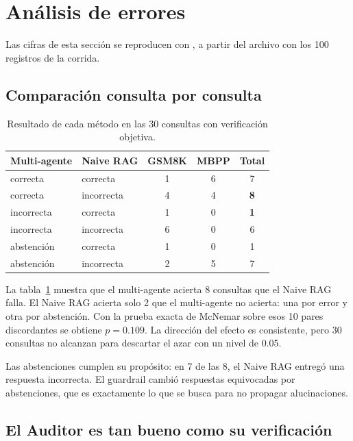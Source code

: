 \section{Análisis de errores}\label{sec:analisis}

Las cifras de esta sección se reproducen con , a partir del archivo con los 100 registros de la corrida.

\subsection{Comparación consulta por consulta}

\begin{table}[ht]
\centering
\caption{Resultado de cada método en las 30 consultas con verificación objetiva.}\label{tab:pares}
\small
\begin{tabular}{@{}llccc@{}}
\toprule
Multi-agente & Naive RAG & GSM8K & MBPP & Total \\
\midrule
correcta   & correcta   & 1 & 6 & 7 \\
correcta   & incorrecta & 4 & 4 & \textbf{8} \\
incorrecta & correcta   & 1 & 0 & \textbf{1} \\
incorrecta & incorrecta & 6 & 0 & 6 \\
abstención & correcta   & 1 & 0 & 1 \\
abstención & incorrecta & 2 & 5 & 7 \\
\bottomrule
\end{tabular}
\end{table}

La tabla~\ref{tab:pares} muestra que el multi-agente acierta 8 consultas que el Naive RAG falla.
El Naive RAG acierta solo 2 que el multi-agente no acierta: una por error y otra por abstención.
Con la prueba exacta de McNemar sobre esos 10 pares discordantes se obtiene $p = 0.109$.
La dirección del efecto es consistente, pero 30 consultas no alcanzan para descartar el azar con un nivel de 0.05.

Las abstenciones cumplen su propósito: en 7 de las 8, el Naive RAG entregó una respuesta incorrecta.
El guardrail cambió respuestas equivocadas por abstenciones, que es exactamente lo que se busca para no propagar alucinaciones.

\subsection{El Auditor es tan bueno como su verificación}

